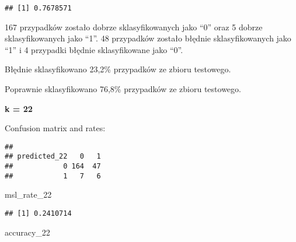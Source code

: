 \documentclass[]{article}
\newenvironment{Shaded}{\begin{snugshade}}{\end{snugshade}}
\newcommand{\KeywordTok}[1]{\textcolor[rgb]{0.13,0.29,0.53}{\textbf{#1}}}
\newcommand{\DecValTok}[1]{\textcolor[rgb]{0.00,0.00,0.81}{#1}}
\newcommand{\StringTok}[1]{\textcolor[rgb]{0.31,0.60,0.02}{#1}}
\newcommand{\OperatorTok}[1]{\textcolor[rgb]{0.81,0.36,0.00}{\textbf{#1}}}
\newcommand{\NormalTok}[1]{#1}
\begin{document}
\begin{verbatim}
## [1] 0.7678571
\end{verbatim}

167 przypadków zostało dobrze sklasyfikowanych jako ``0'' oraz 5 dobrze
sklasyfikowanych jako ``1''. 48 przypadków zostało błędnie
sklasyfikowanych jako ``1'' i 4 przypadki błędnie sklasyfikowane jako
``0''.

Błędnie sklasyfikowano 23,2\% przypadków ze zbioru testowego.

Poprawnie sklasyfikowano 76,8\% przypadków ze zbioru testowego.

\textbf{k = 22}

Confusion matrix and rates:

\begin{Shaded}
\end{Shaded}

\begin{verbatim}
##             
## predicted_22   0   1
##            0 164  47
##            1   7   6
\end{verbatim}

\begin{Shaded}
\begin{Highlighting}[]
\NormalTok{msl_rate_}\DecValTok{22}
\end{Highlighting}
\end{Shaded}

\begin{verbatim}
## [1] 0.2410714
\end{verbatim}

\begin{Shaded}
\begin{Highlighting}[]
\NormalTok{accuracy_}\DecValTok{22}
\end{Highlighting}
\end{Shaded}
\end{document}
